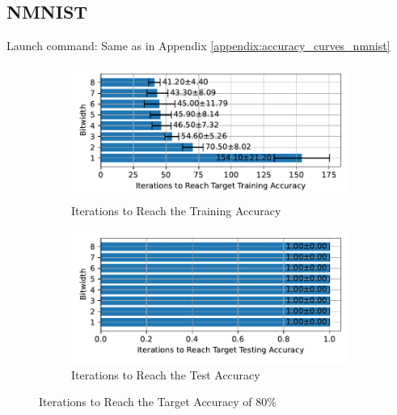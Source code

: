     \subsection{NMNIST}
    \label{appendix:iterations_nmnist}
        Launch command: Same as in Appendix \ref{appendix:accuracy_curves_nmnist}
        \begin{figure}[H]
            \centering
            \begin{subfigure}[H]{0.6\textwidth}
                \centering
                \includegraphics[width=\textwidth]{../standard/NMNIST/plots/nmnist_train_iters_horizontal.pdf}
                \caption{Iterations to Reach the Training Accuracy}
            \end{subfigure}
            \hfill
            \begin{subfigure}[H]{0.6\textwidth}
                \centering
                \includegraphics[width=\textwidth]{../standard/NMNIST/plots/nmnist_test_iters_horizontal.pdf}
                \caption{Iterations to Reach the Test Accuracy}
            \end{subfigure}
            \caption{Iterations to Reach the Target Accuracy of 80\%}
        \end{figure}

